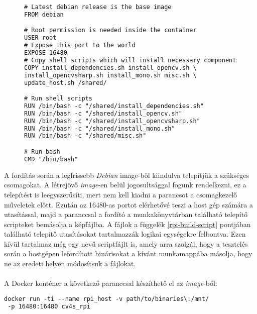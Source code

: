 \begin{figure}[h]
\centering
\begin{minipage}{1\textwidth}
\begin{mdframed}[backgroundcolor=gray!20]
\begin{small}
\begin{lstlisting}[language=XML]
# Latest debian release is the base image
FROM debian

# Root permission is needed inside the container
USER root
# Expose this port to the world
EXPOSE 16480
# Copy shell scripts which will install necessary components
COPY install_dependencies.sh install_opencv.sh \
install_opencvsharp.sh install_mono.sh misc.sh \
update_host.sh /shared/

# Run shell scripts
RUN /bin/bash -c "/shared/install_dependencies.sh"
RUN /bin/bash -c "/shared/install_opencv.sh"
RUN /bin/bash -c "/shared/install_opencvsharp.sh"
RUN /bin/bash -c "/shared/install_mono.sh"
RUN /bin/bash -c "/shared/misc.sh"

# Run bash
CMD "/bin/bash"
\end{lstlisting}
\end{small}
\end{mdframed}
\end{minipage}
\caption{} \label{fig:docker_commands}
\end{figure}

A fordítás során a legfrissebb \emph{Debian} image-ből kiindulva telepítjük a szükséges csomagokat. A létrejövő \emph{image}-en belül  jogosultsággal fogunk rendelkezni, ez a telepítést is leegyszerűsíti, mert nem kell kiadni a  parancsot a csomagkezelő műveletek előtt. Ezután az 16480-as portot elérhetővé teszi a host gép számára a  utasítással, majd a  paranccsal a fordító a munkakönyvtárban található telepítő scripteket bemásolja a képfájlba. A fájlok a függelék \ref{rpi-build-script} pontjában található telepítő utasításokat tartalmazzák logikai egységekre felbontva. Ezen kívül tartalmaz még egy  nevű scriptfájlt is, amely arra szolgál, hogy a tesztelés során a hostgépen lefordított binárisokat a kívánt munkamappába másolja, hogy ne az eredeti helyen módosítsuk a fájlokat.\\
\\
A Docker konténer a következő paranccsal készíthető el az \emph{image}-ből:

\begin{mdframed}[backgroundcolor=gray!20]
\begin{small}
\begin{lstlisting}[language=XML]
docker run -ti --name rpi_host -v path/to/binaries\:/mnt/
 -p 16480:16480 cv4s_rpi
\end{lstlisting}
\end{small}
\end{mdframed}


